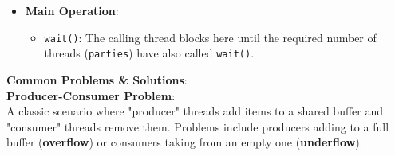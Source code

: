 \documentclass[10pt, a4paper]{article}
\begin{document}
\begin{multicols}{3}
\begin{itemize}[nosep] %
    \item \textbf{Main Operation}:
    \begin{itemize}[nosep] %
        \item \texttt{wait()}: The calling thread blocks here until the required number of threads (\texttt{parties}) have also called \texttt{wait()}.
    \end{itemize}
\end{itemize}

\textbf{Common Problems \& Solutions}: \\
\textbf{Producer-Consumer Problem}: \\
A classic scenario where "producer" threads add items to a shared buffer and "consumer" threads remove them. Problems include producers adding to a full buffer (\textbf{overflow}) or consumers taking from an empty one (\textbf{underflow}).

\vspace{1em} %


\end{multicols}
\end{document}
